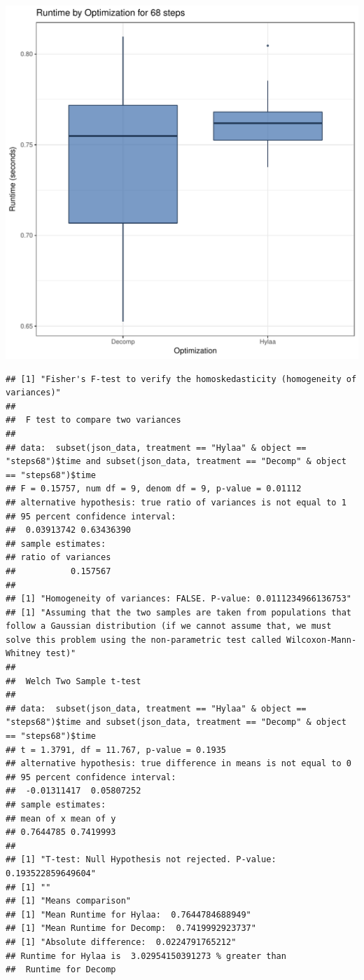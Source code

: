 \documentclass{article}\usepackage[]{graphicx}\usepackage[]{color}
\makeatletter
\def\maxwidth{ %
  \ifdim\Gin@nat@width>\linewidth
    \linewidth
  \else
    \Gin@nat@width
  \fi
}
\newenvironment{kframe}{%
 \def\at@end@of@kframe{}%
 \ifinner\ifhmode%
  \def\at@end@of@kframe{\end{minipage}}%
  \begin{minipage}{\columnwidth}%
 \fi\fi%
 \def\FrameCommand##1{\hskip\@totalleftmargin \hskip-\fboxsep
 \colorbox{shadecolor}{##1}\hskip-\fboxsep
     \hskip-\linewidth \hskip-\@totalleftmargin \hskip\columnwidth}%
 \MakeFramed {\advance\hsize-\width
   \@totalleftmargin\z@ \linewidth\hsize
   \@setminipage}}%
 {\par\unskip\endMakeFramed%
 \at@end@of@kframe}
\newenvironment{knitrout}{}{} %
\makeatother
\begin{document}
\begin{knitrout}
\color{fgcolor}
\includegraphics[width=\maxwidth]{figure/RH2_steps68-1} 
\begin{kframe}\begin{verbatim}
## [1] "Fisher's F-test to verify the homoskedasticity (homogeneity of variances)"
## 
## 	F test to compare two variances
## 
## data:  subset(json_data, treatment == "Hylaa" & object == "steps68")$time and subset(json_data, treatment == "Decomp" & object == "steps68")$time
## F = 0.15757, num df = 9, denom df = 9, p-value = 0.01112
## alternative hypothesis: true ratio of variances is not equal to 1
## 95 percent confidence interval:
##  0.03913742 0.63436390
## sample estimates:
## ratio of variances 
##           0.157567 
## 
## [1] "Homogeneity of variances: FALSE. P-value: 0.0111234966136753"
## [1] "Assuming that the two samples are taken from populations that follow a Gaussian distribution (if we cannot assume that, we must solve this problem using the non-parametric test called Wilcoxon-Mann-Whitney test)"
## 
## 	Welch Two Sample t-test
## 
## data:  subset(json_data, treatment == "Hylaa" & object == "steps68")$time and subset(json_data, treatment == "Decomp" & object == "steps68")$time
## t = 1.3791, df = 11.767, p-value = 0.1935
## alternative hypothesis: true difference in means is not equal to 0
## 95 percent confidence interval:
##  -0.01311417  0.05807252
## sample estimates:
## mean of x mean of y 
## 0.7644785 0.7419993 
## 
## [1] "T-test: Null Hypothesis not rejected. P-value: 0.193522859649604"
## [1] ""
## [1] "Means comparison"
## [1] "Mean Runtime for Hylaa:  0.7644784688949"
## [1] "Mean Runtime for Decomp:  0.7419992923737"
## [1] "Absolute difference:  0.0224791765212"
## Runtime for Hylaa is  3.02954150391273 % greater than 
##  Runtime for Decomp
\end{verbatim}
\end{kframe}
\end{knitrout}
\end{document}
